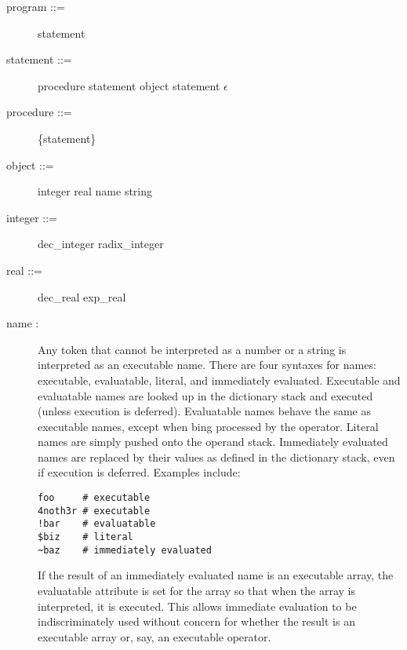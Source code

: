 \begin{description}
\item[{\lt}program{\gt} ::= ] {\lt}statement{\gt}

\item[{\lt}statement{\gt} ::= ] {\lt}procedure{\gt} {\lt}statement{\gt} {\pipe}
{\lt}object{\gt} {\lt}statement{\gt} {\pipe} $\epsilon$

\item[{\lt}procedure{\gt} ::= ] \{{\lt}statement{\gt}\}

\item[{\lt}object{\gt} ::= ] {\lt}integer{\gt} {\pipe} {\lt}real{\gt} {\pipe}
{\lt}name{\gt} {\pipe} {\lt}string{\gt}

\item[{\lt}integer{\gt} ::= ] {\lt}dec\_integer{\gt} {\pipe}
{\lt}radix\_integer{\gt}

\item[{\lt}real{\gt} ::= ] {\lt}dec\_real{\gt} {\pipe} {\lt}exp\_real{\gt}

\item[{\lt}name{\gt} : ] Any token that cannot be interpreted as a number or a
string is interpreted as an executable name.  There are four syntaxes for names:
executable, evaluatable, literal, and immediately evaluated.  Executable and
evaluatable names are looked up in the dictionary stack and executed (unless
execution is deferred).  Evaluatable names behave the same as executable names,
except when bing processed by the 
operator.  Literal names are simply pushed onto the operand stack.  Immediately
evaluated names are replaced by their values as defined in the dictionary stack,
even if execution is deferred.  Examples include:
\begin{verbatim}
foo     # executable
4noth3r # executable
!bar    # evaluatable
$biz    # literal
~baz    # immediately evaluated
\end{verbatim}

If the result of an immediately evaluated name is an executable array, the
evaluatable attribute is set for the array so that when the array is
interpreted, it is executed.  This allows immediate evaluation to be
indiscriminately used without concern for whether the result is an executable
array or, say, an executable operator.


\end{description}
